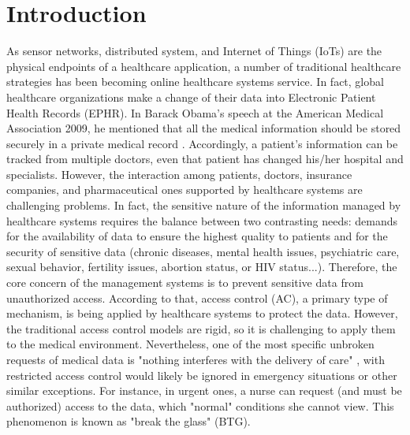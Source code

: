 \section{Introduction}\label{sec:intro}
As sensor networks, distributed system, and Internet of Things (IoTs) are the physical endpoints of a healthcare application, a number of traditional healthcare strategies has been becoming online healthcare systems service.
In fact, global healthcare organizations make a change of their data into Electronic Patient Health Records (EPHR).
In Barack Obama's speech at the American Medical Association 2009, he mentioned that all the medical information should be stored securely in a private medical record \cite{zhang2014role}. 
Accordingly, a patient's information can be tracked from multiple doctors, even that patient has changed his/her hospital and specialists.
However, the interaction among patients, doctors, insurance companies, and pharmaceutical ones supported by healthcare systems are challenging problems. 
In fact, the sensitive nature of the information managed by healthcare systems requires the balance between two contrasting needs: demands for the availability of data to ensure the highest quality to patients and for the security of sensitive data (chronic diseases, mental health issues, psychiatric care, sexual behavior, fertility issues, abortion status, or HIV status...). 
Therefore, the core concern of the management systems is to prevent sensitive data from unauthorized access. 
According to that, access control (AC), a primary type of mechanism, is being applied by healthcare systems to protect the data. 
However, the traditional access control models are rigid, so it is challenging to apply them to the medical environment. 
Nevertheless, one of the most specific unbroken requests of medical data is "nothing interferes with the delivery of care" \cite{grandison2007impact}, with restricted access control would likely be ignored in emergency situations or other similar exceptions. 
For instance, in urgent ones, a nurse can request (and must be authorized) access to the data, which "normal" conditions she cannot view. 
This phenomenon is known as "break the glass" (BTG).

